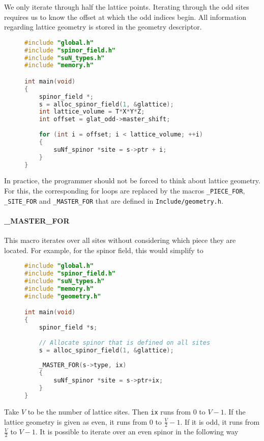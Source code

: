 \documentclass[12pt]{article}
\begin{document}
We only iterate through half the lattice points. Iterating through the odd sites requires us to know the offset at which the odd indices begin. All information regarding lattice geometry is stored in the geometry descriptor.

\begin{figure}[H]
\begin{lstlisting}[caption=CPU Iterate through odd sites,language=C]
#include "global.h"
#include "spinor_field.h"
#include "suN_types.h"
#include "memory.h"

int main(void) 
{
    spinor_field *;
    s = alloc_spinor_field(1, &glattice);
    int lattice_volume = T*X*Y*Z;
    int offset = glat_odd->master_shift;
    
    for (int i = offset; i < lattice_volume; ++i) 
    {
        suNf_spinor *site = s->ptr + i;
    }
}
\end{lstlisting}
\end{figure}

In practice, the programmer should not be forced to think about lattice geometry. For this, the corresponding for loops are replaced by the macros \texttt{\_PIECE\_FOR}, \texttt{\_SITE\_FOR} and \texttt{\_MASTER\_FOR} that are defined in \texttt{Include/geometry.h}.

\paragraph{\_MASTER\_FOR} This macro iterates over all sites without considering which piece they are located. For example, for the spinor field, this would simplify to

\begin{figure}[H]
\begin{lstlisting}[caption=Iterate over spinor field that is defined on all lattice sites,language=C]
#include "global.h"
#include "spinor_field.h"
#include "suN_types.h"
#include "memory.h"
#include "geometry.h"

int main(void) 
{
    spinor_field *s;
    
    // Allocate spinor that is defined on all sites
    s = alloc_spinor_field(1, &glattice);
    
    _MASTER_FOR(s->type, ix) 
    {
        suNf_spinor *site = s->ptr+ix;
    }
}
\end{lstlisting}
\end{figure}

Take $V$ to be the number of lattice sites. Then \texttt{ix} runs from 0 to $V-1$. If the lattice geometry is given as even, it runs from 0 to $\tfrac{V}{2}-1$. If it is odd, it runs from $\tfrac{V}{2}$ to $V-1$. It is possible to iterate over an even spinor in the following way
\end{document}
